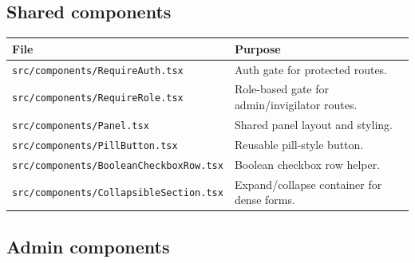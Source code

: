 \subsection{Shared components}
\label{subsec:frontend:components:detail:shared}

\begin{longtable}{p{}p{}}
\toprule
\textbf{File} & \textbf{Purpose} \\
\midrule
\texttt{src/components/RequireAuth.tsx} & Auth gate for protected routes. \\
\texttt{src/components/RequireRole.tsx} & Role-based gate for admin/invigilator routes. \\
\texttt{src/components/Panel.tsx} & Shared panel layout and styling. \\
\texttt{src/components/PillButton.tsx} & Reusable pill-style button. \\
\texttt{src/components/BooleanCheckboxRow.tsx} & Boolean checkbox row helper. \\
\texttt{src/components/CollapsibleSection.tsx} & Expand/collapse container for dense forms. \\
\bottomrule
\end{longtable}

\subsection{Admin components}
\label{subsec:frontend:components:detail:admin}

